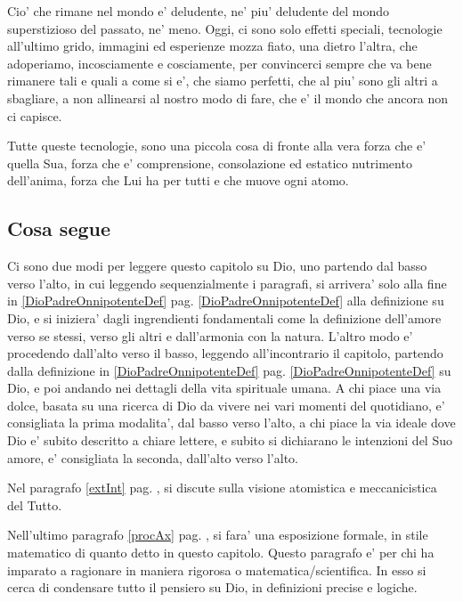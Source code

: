 Cio' che rimane nel mondo e' deludente, ne' piu' deludente del mondo superstizioso del passato, ne' meno. Oggi, ci sono solo effetti speciali, tecnologie all'ultimo grido, immagini ed esperienze mozza fiato, una dietro l'altra, che adoperiamo, incosciamente e cosciamente, per convincerci sempre che va bene rimanere tali e quali a come si e', che siamo perfetti, che al piu' sono gli altri a sbagliare, a non allinearsi al nostro modo di fare, che e' il mondo che ancora non ci capisce.

Tutte queste tecnologie, sono una piccola cosa di fronte alla vera forza che e' quella Sua, forza che e' comprensione, consolazione ed estatico nutrimento dell'anima, forza che Lui ha per tutti e che muove ogni atomo.

\subsection{Cosa segue}

Ci sono due modi per leggere questo capitolo su Dio, uno partendo dal basso verso l'alto, in cui leggendo sequenzialmente i paragrafi, si arrivera' solo alla fine in \ref{DioPadreOnnipotenteDef} pag. \ref{DioPadreOnnipotenteDef} alla definizione su Dio, e si iniziera' dagli ingrendienti fondamentali come la definizione dell'amore verso se stessi, verso gli altri e dall'armonia con la natura. L'altro modo e' procedendo dall'alto verso il basso, leggendo all'incontrario il capitolo, partendo dalla definizione in \ref{DioPadreOnnipotenteDef} pag. \ref{DioPadreOnnipotenteDef} su Dio, e poi andando nei dettagli della vita spirituale umana. A chi piace una via dolce, basata su una ricerca di Dio da vivere nei vari momenti del quotidiano, e' consigliata la prima modalita', dal basso verso l'alto, a chi piace la via ideale dove Dio e' subito descritto a chiare lettere, e subito si dichiarano le intenzioni del Suo amore, e' consigliata la seconda, dall'alto verso l'alto.

Nel paragrafo \ref{extInt} pag. \pageref{extInt}, si discute sulla visione atomistica e meccanicistica del Tutto.

Nell'ultimo paragrafo \ref{procAx} pag. \pageref{procAx}, si fara' una esposizione formale, in stile matematico di quanto detto in questo capitolo. Questo paragrafo e' per chi ha imparato a ragionare in maniera rigorosa o matematica/scientifica. In esso si cerca di condensare tutto il pensiero su Dio, in definizioni precise e logiche.

